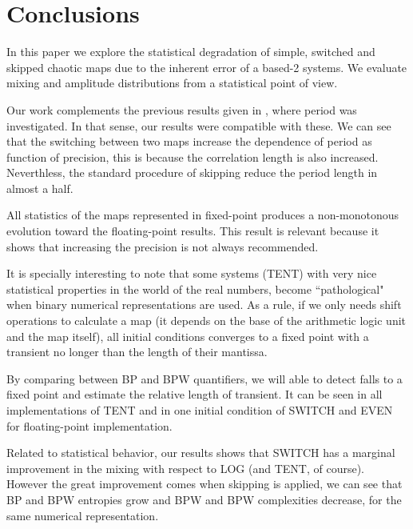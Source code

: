 \section{Conclusions}\label{sec:conclusions}
In this paper we explore the statistical degradation of simple, switched and skipped chaotic maps due to the inherent error of a based-2 systems.
We evaluate mixing and amplitude distributions from a statistical point of view.

Our work complements the previous results given in \cite{Nagaraj2008}, where period was investigated.
In that sense, our results were compatible with these.
We can see that the switching between two maps increase the dependence of period as function of precision, this is because the correlation length is also increased.
Neverthless, the standard procedure of skipping reduce the period length in almost a half.

All statistics of the maps represented in fixed-point produces a non-monotonous evolution toward the floating-point results.
This result is relevant because it shows that increasing the precision is not always recommended.

It is specially interesting to note that some systems (TENT) with very nice statistical properties in the world of the real numbers, become ``pathological" when binary numerical representations are used.
As a rule, if we only needs shift operations to calculate a map (it depends on the base of the arithmetic logic unit and the map itself), all initial conditions converges to a fixed point with a transient no longer than the length of their mantissa.

By comparing between BP and BPW quantifiers, we will able to detect falls to a fixed point and estimate the relative length of transient. It can be seen in all implementations of TENT and in one initial condition of SWITCH and EVEN for floating-point implementation.

Related to statistical behavior, our results shows that SWITCH has a marginal improvement in the mixing with respect to LOG (and TENT, of course).
However the great improvement comes when skipping is applied, we can see that BP and BPW entropies grow and BPW and BPW complexities decrease, for the same numerical representation.
